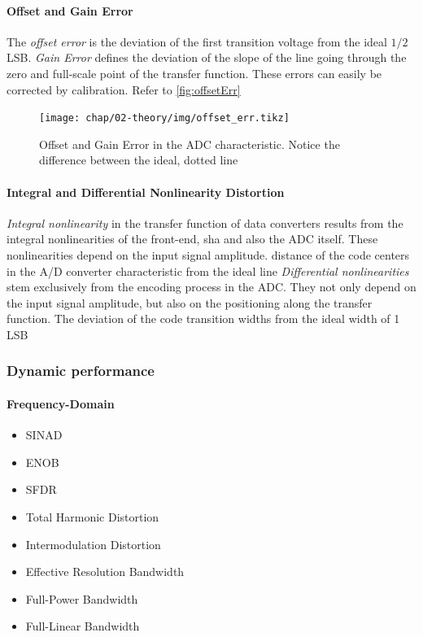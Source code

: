 \paragraph{Offset and Gain Error}
The \textit{offset error} is the deviation of the first transition voltage from the ideal $1/2$ LSB. \textit{Gain Error} defines the deviation of the slope of the line going through the zero and full-scale point of the transfer function. These errors can easily be corrected by calibration. Refer to \autoref{fig:offsetErr}

\begin{figure}[H]
	\centering
	\texttt{[image: chap/02-theory/img/offset\_err.tikz]}
	\caption{Offset and Gain Error in the ADC characteristic. Notice the difference between the ideal, dotted line}
	\label{fig:offsetErr}
\end{figure}


\paragraph{Integral and Differential Nonlinearity Distortion} 
\textit{Integral nonlinearity} in the transfer function of data converters results from the integral nonlinearities of the front-end, \gls{sha} and also the ADC itself. These nonlinearities depend on the input signal amplitude. distance of the code centers in the A/D converter characteristic from the ideal line
\textit{Differential nonlinearities} stem exclusively from the encoding process in the ADC. They not only depend on the input signal amplitude, but also on the positioning along the transfer function. The deviation of the code transition widths from the ideal width
of 1 LSB




\subsubsection{Dynamic performance}
\paragraph{Frequency-Domain}
\begin{itemize}
	\item SINAD
	\item ENOB
	\item SFDR
	\item Total Harmonic Distortion
	\item Intermodulation Distortion
	\item Effective Resolution Bandwidth
	\item Full-Power Bandwidth
	\item Full-Linear Bandwidth
\end{itemize}
